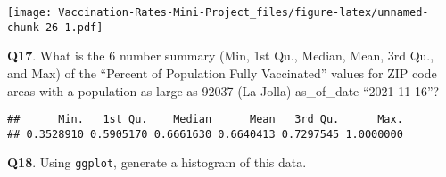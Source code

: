 \documentclass[
]{article}
\newenvironment{Shaded}{\begin{snugshade}}{\end{snugshade}}
\newcommand{\FloatTok}[1]{\textcolor[rgb]{0.00,0.00,0.81}{#1}}
\newcommand{\FunctionTok}[1]{\textcolor[rgb]{0.00,0.00,0.00}{#1}}
\newcommand{\NormalTok}[1]{#1}
\newcommand{\OtherTok}[1]{\textcolor[rgb]{0.56,0.35,0.01}{#1}}
\newcommand{\SpecialCharTok}[1]{\textcolor[rgb]{0.00,0.00,0.00}{#1}}
\begin{document}
\texttt{[image: Vaccination-Rates-Mini-Project\_files/figure-latex/unnamed-chunk-26-1.pdf]}

\textbf{Q17}. What is the 6 number summary (Min, 1st Qu., Median, Mean,
3rd Qu., and Max) of the ``Percent of Population Fully Vaccinated''
values for ZIP code areas with a population as large as 92037 (La Jolla)
as\_of\_date ``2021-11-16''?

\begin{Shaded}
\end{Shaded}

\begin{verbatim}
##      Min.   1st Qu.    Median      Mean   3rd Qu.      Max. 
## 0.3528910 0.5905170 0.6661630 0.6640413 0.7297545 1.0000000
\end{verbatim}

\textbf{Q18}. Using \texttt{ggplot}, generate a histogram of this data.

\begin{Shaded}
\end{Shaded}
\end{document}
